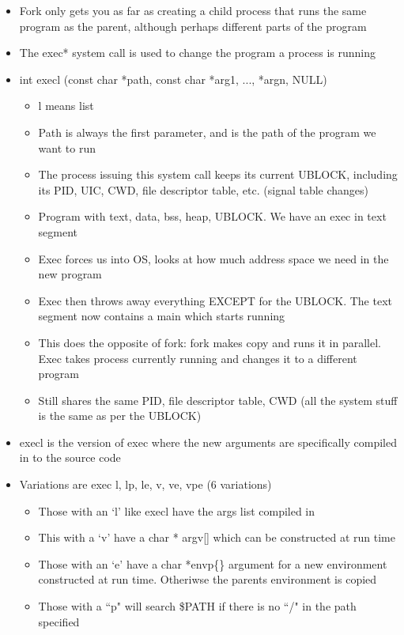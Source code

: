\begin{itemize}
    \item Fork only gets you as far as creating a child process that runs the same program as the parent, although perhaps different parts of the program
    \item The exec* system call is used to change the program a process is running
    \item int execl (const char *path, const char *arg1, ..., *argn, NULL)
    \begin{itemize}
        \item l means list
        \item Path is always the first parameter, and is the path of the program we want to run
        \item The process issuing this system call keeps its current UBLOCK, including its PID, UIC, CWD, file descriptor table, etc. (signal table changes)
        \item Program with text, data, bss, heap, UBLOCK. We have an exec in text segment
        \item Exec forces us into OS, looks at how much address space we need in the new program
        \item Exec then throws away everything EXCEPT for the UBLOCK. The text segment now contains a main which starts running
        \item This does the opposite of fork: fork makes copy and runs it in parallel. Exec takes process currently running and changes it to a different program
        \item Still shares the same PID, file descriptor table, CWD (all the system stuff is the same as per the UBLOCK)
    \end{itemize}
    \item execl is the version of exec where the new arguments are specifically compiled in to the source code
    \item Variations are exec l, lp, le, v, ve, vpe (6 variations)
    \begin{itemize}
        \item Those with an `l' like execl have the args list compiled in
        \item This with a `v' have a char * argv[] which can be constructed at run time
        \item Those with an `e' have a char *envp\{\} argument for a new environment constructed at run time. Otheriwse the parents environment is copied
        \item Those with a ``p" will search \$PATH if there is no ``/" in the path specified
    \end{itemize}
\end{itemize}

